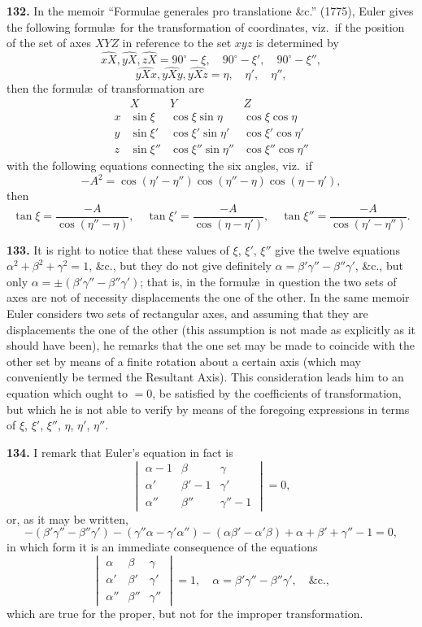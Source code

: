 \documentclass[11pt,a4paper]{book}
\begin{document}
\textbf{132.} In the memoir ``Formulae generales pro translatione \&c.'' (1775), Euler gives the following formul\ae\ for the transformation of coordinates, viz.\ if the position of the set of axes $XYZ$ in reference to the set $xyz$ is determined by
\[
\widehat{xX}, \widehat{yX}, \widehat{zX} = 90^\circ - \xi, \quad 90^\circ - \xi', \quad 90^\circ - \xi'',
\]
\[
\widehat{yXx}, \widehat{yXy}, \widehat{yXz} = \eta, \quad \eta', \quad \eta'',
\]
then the formul\ae\ of transformation are
\[
\begin{array}{c|ccc}
& X & Y & Z \\ \hline
x & \sin\xi & \cos\xi\sin\eta & \cos\xi\cos\eta \\
y & \sin\xi' & \cos\xi'\sin\eta' & \cos\xi'\cos\eta' \\
z & \sin\xi'' & \cos\xi''\sin\eta'' & \cos\xi''\cos\eta''
\end{array}
\]
with the following equations connecting the six angles, viz.\ if
\[
-A^2 = \cos(\eta' - \eta'')\cos(\eta'' - \eta)\cos(\eta - \eta'),
\]
then
\[
\tan\xi = \frac{-A}{\cos(\eta'' - \eta)}, \quad
\tan\xi' = \frac{-A}{\cos(\eta - \eta')}, \quad
\tan\xi'' = \frac{-A}{\cos(\eta' - \eta'')}.
\]

\textbf{133.} It is right to notice that these values of $\xi$, $\xi'$, $\xi''$ give the twelve equations $\alpha^2 + \beta^2 + \gamma^2 = 1$, \&c., but they do not give definitely $\alpha = \beta'\gamma'' - \beta''\gamma'$, \&c., but only $\alpha = \pm(\beta'\gamma'' - \beta''\gamma')$; that is, in the formul\ae\ in question the two sets of axes are not of necessity displacements the one of the other. In the same memoir Euler considers two sets of rectangular axes, and assuming that they are displacements the one of the other (this assumption is not made as explicitly as it should have been), he remarks that the one set may be made to coincide with the other set by means of a finite rotation about a certain axis (which may conveniently be termed the Resultant Axis). This consideration leads him to an equation which ought to $= 0$, be satisfied by the coefficients of transformation, but which he is not able to verify by means of the foregoing expressions in terms of $\xi$, $\xi'$, $\xi''$, $\eta$, $\eta'$, $\eta''$.

\textbf{134.} I remark that Euler's equation in fact is
\[
\begin{vmatrix}
\alpha - 1 & \beta & \gamma \\
\alpha' & \beta' - 1 & \gamma' \\
\alpha'' & \beta'' & \gamma'' - 1
\end{vmatrix} = 0,
\]
or, as it may be written,
\[
-(\beta'\gamma'' - \beta''\gamma') - (\gamma''\alpha - \gamma'\alpha'') - (\alpha\beta' - \alpha'\beta) + \alpha + \beta' + \gamma'' - 1 = 0,
\]
in which form it is an immediate consequence of the equations
\[
\begin{vmatrix}
\alpha & \beta & \gamma \\
\alpha' & \beta' & \gamma' \\
\alpha'' & \beta'' & \gamma''
\end{vmatrix} = 1, \quad \alpha = \beta'\gamma'' - \beta''\gamma', \quad \&\text{c.},
\]
which are true for the proper, but not for the improper transformation.
\end{document}
